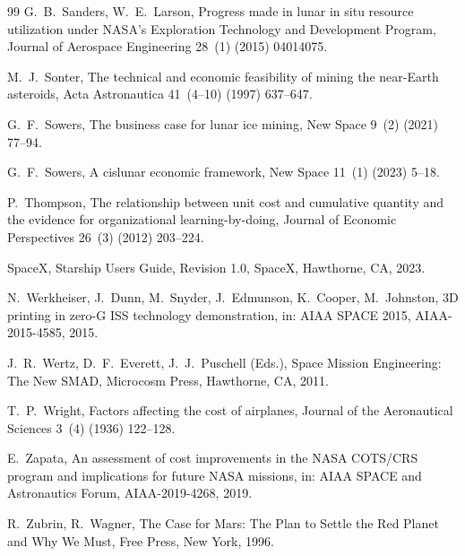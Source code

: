 \documentclass[preprint,12pt]{elsarticle}
\begin{document}
\begin{thebibliography}{99}
G.~B.~Sanders, W.~E.~Larson,
\newblock Progress made in lunar in situ resource utilization under NASA's Exploration Technology and Development Program,
\newblock Journal of Aerospace Engineering 28~(1) (2015) 04014075.

M.~J.~Sonter,
\newblock The technical and economic feasibility of mining the near-Earth asteroids,
\newblock Acta Astronautica 41~(4--10) (1997) 637--647.

G.~F.~Sowers,
\newblock The business case for lunar ice mining,
\newblock New Space 9~(2) (2021) 77--94.

G.~F.~Sowers,
\newblock A cislunar economic framework,
\newblock New Space 11~(1) (2023) 5--18.

P.~Thompson,
\newblock The relationship between unit cost and cumulative quantity and the evidence for organizational learning-by-doing,
\newblock Journal of Economic Perspectives 26~(3) (2012) 203--224.

SpaceX,
\newblock Starship Users Guide, Revision 1.0,
\newblock SpaceX, Hawthorne, CA, 2023.

N.~Werkheiser, J.~Dunn, M.~Snyder, J.~Edmunson, K.~Cooper, M.~Johnston,
\newblock 3D printing in zero-G ISS technology demonstration,
\newblock in: AIAA SPACE 2015, AIAA-2015-4585, 2015.

J.~R.~Wertz, D.~F.~Everett, J.~J.~Puschell (Eds.),
\newblock Space Mission Engineering: The New SMAD,
\newblock Microcosm Press, Hawthorne, CA, 2011.

T.~P.~Wright,
\newblock Factors affecting the cost of airplanes,
\newblock Journal of the Aeronautical Sciences 3~(4) (1936) 122--128.

E.~Zapata,
\newblock An assessment of cost improvements in the NASA COTS/CRS program and implications for future NASA missions,
\newblock in: AIAA SPACE and Astronautics Forum, AIAA-2019-4268, 2019.

R.~Zubrin, R.~Wagner,
\newblock The Case for Mars: The Plan to Settle the Red Planet and Why We Must,
\newblock Free Press, New York, 1996.

\end{thebibliography}
\end{document}
